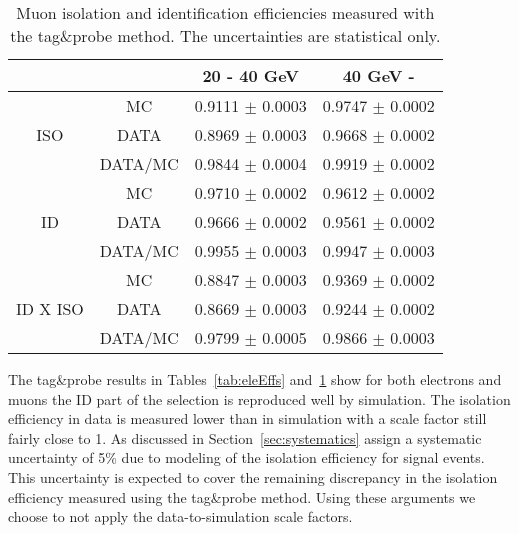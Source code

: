 \begin{table}[h]
\begin{center}
\begin{tabular}{c|c|cc}
\hline\hline
& & 20 - 40 GeV & 40 GeV -  \\ 
\hline
				& MC			& 	0.9111 $\pm$ 0.0003& 	0.9747 $\pm$ 0.0002 \\
ISO				& DATA			& 	0.8969 $\pm$ 0.0003& 	0.9668 $\pm$ 0.0002 \\
				& DATA/MC		& 	0.9844 $\pm$ 0.0004& 	0.9919 $\pm$ 0.0002 \\
\hline
				& MC			& 	0.9710 $\pm$ 0.0002& 	0.9612 $\pm$ 0.0002 \\
ID				& DATA			& 	0.9666 $\pm$ 0.0002& 	0.9561 $\pm$ 0.0002 \\
				& DATA/MC		& 	0.9955 $\pm$ 0.0003& 	0.9947 $\pm$ 0.0003 \\
\hline
				& MC			& 	0.8847 $\pm$ 0.0003& 	0.9369 $\pm$ 0.0002 \\
ID X ISO		& DATA			& 	0.8669 $\pm$ 0.0003& 	0.9244 $\pm$ 0.0002 \\
				& DATA/MC		& 	0.9799 $\pm$ 0.0005& 	0.9866 $\pm$ 0.0003 \\
\hline \hline
\end{tabular}
\caption{\label{tab:muEffs}Muon isolation and identification efficiencies measured with the tag\&probe method.
The uncertainties are statistical only.}
\end{center}
\end{table}

The tag\&probe results in Tables~\ref{tab:eleEffs} and~\ref{tab:muEffs} show for both electrons
and muons the ID part of the selection is reproduced well by simulation.
The isolation efficiency in data is measured lower than in simulation with a scale factor still fairly close to 1.
As discussed in Section~\ref{sec:systematics} assign a systematic uncertainty of 5\% 
due to modeling of the isolation efficiency for signal events.
This uncertainty is expected to cover the remaining discrepancy in the isolation efficiency measured
using the tag\&probe method.
Using these arguments we choose to not apply the data-to-simulation scale factors.
